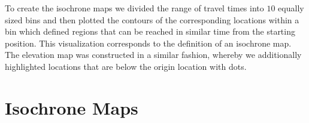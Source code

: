 \documentclass{article}
\begin{document}
To create the isochrone maps we divided the range of travel times into $10$ equally sized bins and then plotted the contours of the corresponding locations within a bin which defined regions that can be reached in similar time from the starting position. This visualization corresponds to the definition of an isochrone map. The elevation map was constructed in a similar fashion, whereby we additionally highlighted locations that are below the origin location with dots. 



\section{Isochrone Maps}
\end{document}
